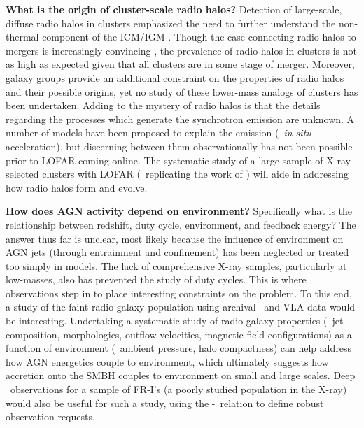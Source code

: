 \documentclass[12pt]{article}
\begin{document}
{\bf{What is the origin of cluster-scale radio halos?}} Detection of
large-scale, diffuse radio halos in clusters emphasized the need to
further understand the non-thermal component of the ICM/IGM
\cite[\eg][]{2009ApJ...704L..54G, 2009A&A...507.1257G}. Though the
case connecting radio halos to mergers is increasingly convincing
\cite{2009A&A...507..661B}, the prevalence of radio halos in clusters
is not as high as expected given that all clusters are in some stage
of merger. Moreover, galaxy groups provide an additional constraint on
the properties of radio halos and their possible origins, yet no study
of these lower-mass analogs of clusters has been undertaken. Adding to
the mystery of radio halos is that the details regarding the processes
which generate the synchrotron emission are unknown. A number of
models have been proposed to explain the emission (\eg\ {\textit{in
    situ}} acceleration), but discerning between them observationally
has not been possible prior to LOFAR coming online. The systematic
study of a large sample of X-ray selected clusters with LOFAR
(\eg\ replicating the work of \cite{2007A&A...463..937V,
  2008A&A...484..327V}) will aide in addressing how radio halos form
and evolve.

{\bf{How does AGN activity depend on environment?}} Specifically what
is the relationship between redshift, duty cycle, environment, and
feedback energy? The answer thus far is unclear, most likely because
the influence of environment on AGN jets (through entrainment and
confinement) has been neglected or treated too simply in models. The
lack of comprehensive X-ray samples, particularly at low-masses, also
has prevented the study of duty cycles. This is where observations
step in to place interesting constraints on the problem. To this end,
a study of the faint radio galaxy population using archival
\chandra\ and VLA data would be interesting. Undertaking a systematic
study of radio galaxy properties (\ie\ jet composition, morphologies,
outflow velocities, magnetic field configurations) as a function of
environment (\ie\ ambient pressure, halo compactness) can help address
how AGN energetics couple to environment, which ultimately suggests
how accretion onto the SMBH couples to environment on small and large
scales. Deep \chandra\ observations for a sample of FR-I's (a poorly
studied population in the X-ray) would also be useful for such a
study, using the \pjet-\prad\ relation to define robust observation
requests.
\end{document}
